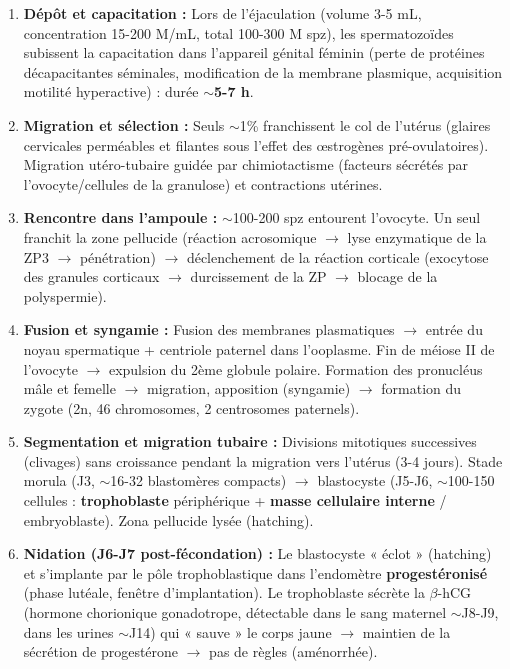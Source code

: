\documentclass[11pt]{article}
\newcommand{\cle}[1]{{\popxbold\color{popdark}#1}}
\begin{document}
\begin{methode}
\begin{enumerate}
    \item \textbf{Dépôt et capacitation :} Lors de l'éjaculation (volume 3-5 mL, concentration 15-200 M/mL, total 100-300 M spz), les spermatozoïdes subissent la \cle{capacitation} dans l'appareil génital féminin (perte de protéines décapacitantes séminales, modification de la membrane plasmique, acquisition motilité hyperactive) : durée \textbf{$\sim$5-7 h}.
    \item \textbf{Migration et sélection :} Seuls $\sim$1\% franchissent le col de l'utérus (glaires cervicales perméables et filantes sous l'effet des œstrogènes pré-ovulatoires). Migration utéro-tubaire guidée par chimiotactisme (facteurs sécrétés par l'ovocyte/cellules de la granulose) et contractions utérines.
    \item \textbf{Rencontre dans l'ampoule :} $\sim$100-200 spz entourent l'ovocyte. Un seul franchit la \cle{zone pellucide} (réaction acrosomique $\rightarrow$ lyse enzymatique de la ZP3 $\rightarrow$ pénétration) $\rightarrow$ déclenchement de la \cle{réaction corticale} (exocytose des granules corticaux $\rightarrow$ durcissement de la ZP $\rightarrow$ blocage de la polyspermie).
    \item \textbf{Fusion et syngamie :} Fusion des membranes plasmatiques $\rightarrow$ entrée du noyau spermatique + centriole paternel dans l'ooplasme. Fin de méiose II de l'ovocyte $\rightarrow$ expulsion du 2ème globule polaire. Formation des pronucléus mâle et femelle $\rightarrow$ migration, apposition (syngamie) $\rightarrow$ formation du \cle{zygote} (2n, 46 chromosomes, 2 centrosomes paternels).
    \item \textbf{Segmentation et migration tubaire :} Divisions mitotiques successives (clivages) sans croissance pendant la migration vers l'utérus (3-4 jours). Stade \cle{morula} (J3, $\sim$16-32 blastomères compacts) $\rightarrow$ \cle{blastocyste} (J5-J6, $\sim$100-150 cellules : \textbf{trophoblaste} périphérique + \textbf{masse cellulaire interne} / embryoblaste). Zona pellucide lysée (hatching).
    \item \textbf{Nidation (J6-J7 post-fécondation) :} Le blastocyste « éclot » (hatching) et s'implante par le pôle trophoblastique dans l'endomètre \textbf{progestéronisé} (phase lutéale, fenêtre d'implantation). Le trophoblaste sécrète la \cle{$\beta$-hCG} (hormone chorionique gonadotrope, détectable dans le sang maternel $\sim$J8-J9, dans les urines $\sim$J14) qui « sauve » le corps jaune $\rightarrow$ maintien de la sécrétion de progestérone $\rightarrow$ pas de règles (aménorrhée).
\end{enumerate}
\end{methode}
\end{document}
